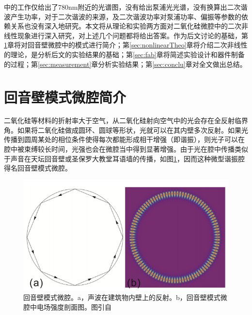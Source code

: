 \documentclass[UTF8,a4paper,cs4size,hyperref]{ctexart}
\begin{document}
\cite{asano2016visible}中的工作仅给出了780nm附近的光谱图，没有给出泵浦光光谱，没有换算出二次谐波产生功率，对于二次谐波的来源，及二次谐波功率对泵浦功率、偏振等参数的依赖关系也没有深入地研究。本文将从理论和实验两方面对二氧化硅微腔中的二次非线性现象进行深入研究，对上述几个问题都将给出答案。作为后文讨论的基础，第\ref{sec:WGM}章将对回音壁微腔中的模式进行简介；第\ref{sec:nonlinearTheo}章将介绍二次非线性的理论，是分析后文的实验结果的基础；第\ref{sec:fab}章将简述实验设计和器件制备的过程；第\ref{sec:measurement}章分析实验结果；第\ref{sec:conclu}章对全文做出总结。

\newpage
\section{回音壁模式微腔简介}
\label{sec:WGM}

二氧化硅等材料的折射率大于空气，从二氧化硅射向空气中的光会存在全反射临界角。如果将二氧化硅做成圆环、圆球等形状，光就可以在其内壁多次反射。如果光传播到圆周某处的相位条件使得每次都能形成相干增强（即谐振），则光子可以在腔中被束缚较长时间，光强也会在微腔当中得到显著增强。由于光在腔中传播类似于声音在天坛回音壁或圣保罗大教堂耳语墙的传播，如图\ref{pic:WGM}，因而这种微型谐振腔得名回音壁模式微腔。

\begin{figure}
\centering
\includegraphics[width=14cm]{WGM}
\caption{回音壁模式微腔。a，声波在建筑物内壁上的反射。b，回音壁模式微腔中电场强度剖面图。图引自\cite{LiBeiBei2014}}
\label{pic:WGM}
\end{figure}
\end{document}

